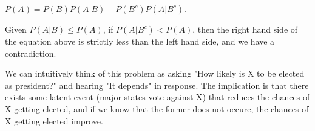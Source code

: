 $P(A) = P(B)P(A|B) + P(B^{c})P(A|B^{c})$.

Given $P(A|B) \leq P(A)$, if $P(A|B^{c}) < P(A)$, then the right hand side of 
the equation above is strictly less than the left hand side, and we have a 
contradiction.

We can intuitively think of this problem as asking "How likely is X to be 
elected as president?" and hearing "It depends" in response. The implication 
is that there exists some latent event (major states vote against X) that 
reduces the chances of X getting elected, and if we know that the former does 
not occure, the chances of X getting elected improve.